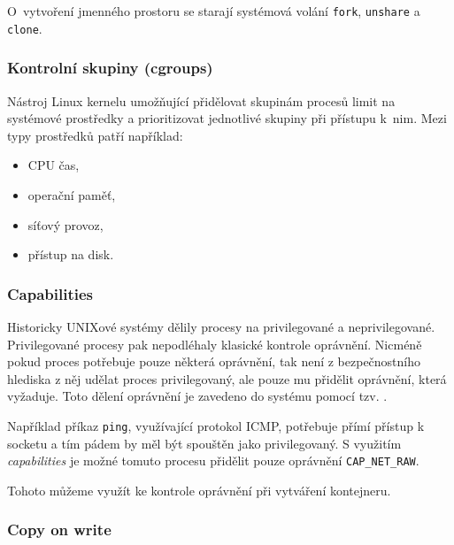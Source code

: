 
O~vytvoření jmenného prostoru se starají systémová volání \verb|fork|, \verb|unshare| a \verb|clone|.

\subsubsection{Kontrolní skupiny (cgroups)}

Nástroj Linux kernelu umožňující přidělovat skupinám procesů limit na systémové prostředky a prioritizovat jednotlivé skupiny při přístupu k~nim.
Mezi typy prostředků patří například:

\begin{itemize}
	\item CPU čas,
	\item operační paměť,
	\item síťový provoz,
	\item přístup na disk.
\end{itemize} %

\subsubsection{Capabilities}

Historicky UNIXové systémy dělily procesy na privilegované a neprivilegované.
Privilegované procesy pak nepodléhaly klasické kontrole oprávnění.
Nicméně pokud proces potřebuje pouze některá oprávnění, tak není z bezpečnostního hlediska z něj udělat proces privilegovaný, ale pouze mu přidělit oprávnění, která vyžaduje.
Toto dělení oprávnění je zavedeno do systému pomocí tzv. .

Například příkaz \verb|ping|, využívající protokol ICMP, potřebuje přímí přístup k socketu a tím pádem by měl být spouštěn jako privilegovaný.
S využitím \textit{capabilities} je možné tomuto procesu přidělit pouze oprávnění \verb|CAP_NET_RAW|.

Tohoto můžeme využít ke kontrole oprávnění při vytváření kontejneru.


\subsubsection{Copy on write}


